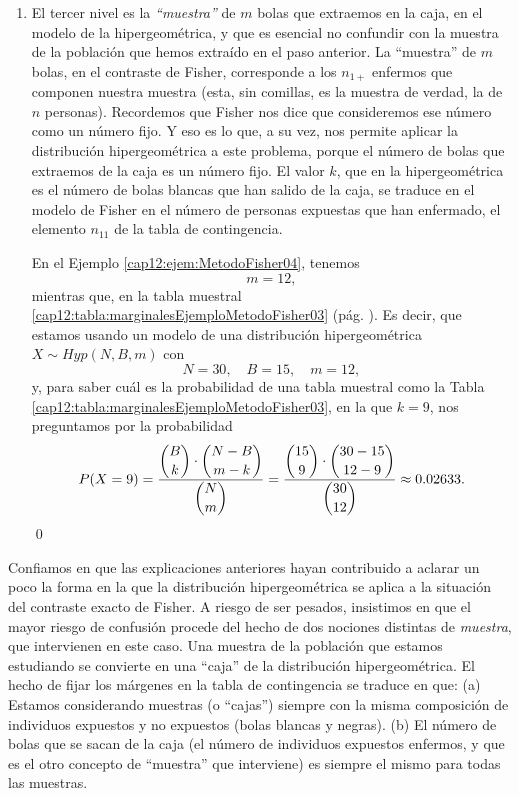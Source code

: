 \begin{enumerate}
  \item El tercer nivel es la {\em ``muestra''} de $m$ bolas que extraemos en la caja, en el modelo de la hipergeométrica, y que es esencial no confundir con la muestra de la población que hemos extraído en el paso anterior. La ``muestra'' de $m$ bolas, en el contraste de Fisher, corresponde a los $n_{1+}$ enfermos que componen nuestra muestra (esta, sin comillas, es la muestra de verdad, la de $n$ personas). Recordemos que Fisher nos dice que consideremos ese número como un número fijo. Y eso es lo que, a su vez, nos permite aplicar la distribución hipergeométrica a este problema, porque el número de bolas que extraemos de la caja es un número fijo. El valor $k$, que en la hipergeométrica es el número de bolas blancas que han salido de la caja, se traduce en el modelo de Fisher en el número de personas expuestas que han enfermado, el elemento $n_{11}$ de la tabla de contingencia.
      \begin{ejemplo}
      \label{cap12:ejem:MetodoFisher05}
      En el Ejemplo \ref{cap12:ejem:MetodoFisher04}, tenemos
      \[m=12,\]
      mientras que, en la tabla muestral \ref{cap12:tabla:marginalesEjemploMetodoFisher03} (pág. \pageref{cap12:tabla:marginalesEjemploMetodoFisher03}). Es decir, que estamos usando un modelo de una distribución hipergeométrica $X\sim Hyp(N,B,m)$ con
      \[N=30,\quad B=15,\quad m=12, \]
      y, para saber cuál es la probabilidad de una tabla muestral como la Tabla \ref{cap12:tabla:marginalesEjemploMetodoFisher03}, en la que $k=9$, nos preguntamos por la probabilidad
      \[
        P(X=9)=\dfrac{\dbinom{B}{k}\cdot\dbinom{N-B}{m-k}}{\dbinom{N}{m}}=
          \dfrac{\dbinom{15}{9}\cdot\dbinom{30-15}{12-9}}{\dbinom{30}{12}}\approx  0.02633
      .\]
      \qed
      \end{ejemplo}

\end{enumerate}
Confiamos en que las explicaciones anteriores hayan contribuido a aclarar un poco la forma en la que la distribución hipergeométrica se aplica a la situación del contraste exacto de Fisher. A riesgo de ser pesados, insistimos en que el mayor riesgo de confusión procede del hecho de dos nociones distintas de {\em muestra}, que intervienen en este caso. Una muestra de la población que estamos estudiando se convierte en una ``caja'' de la distribución hipergeométrica. El hecho de fijar los márgenes en la tabla de contingencia se traduce en que: (a) Estamos considerando muestras (o ``cajas'') siempre con la misma composición de individuos expuestos y no expuestos (bolas blancas y negras).  (b)  El número de bolas que se sacan de la caja (el número de individuos expuestos enfermos, y que es el otro concepto de ``muestra'' que interviene) es siempre el mismo para todas las muestras.

